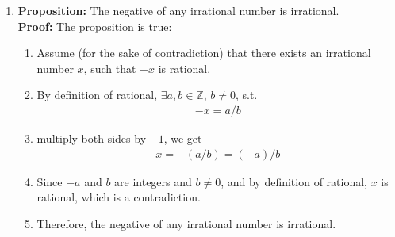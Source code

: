 \documentclass[11pt, preview]{standalone} %
\begin{document}
\begin{enumerate}
\begin{enumerate}[(1)]
    \begin{align*}
      6 \times y \geq 6 \times 6
      \text{ i.e. } 6 \times y \geq 36
    \end{align*}
  \item So $x \times y \geq 36$
  \item Therefore, if $x \times y < 36$ then $x < 6$ or $y < 6$.
  \end{enumerate}
  \begin{Choices}
    \begin{enumerate}
    \TrueChoice\item The proof is correct.
    \FalseChoice\item The proof is incorrect because (1) is not a negation of the
      original implication's conclusion.
    \FalseChoice\item The proof is incorrect because there is an error at (2).
    \FalseChoice\item The proof is incorrect because from (1) - (4) we cannot get (5).
    \end{enumerate}
    \Solution The proof is correct. It is a proof by contraposition, 
    i.e., to prove ``$x \times y < 36 \implies (x < 6 \lor y < 6)$'', 
    we first prove ``$(x \geq 6 \land y \geq 6) \implies x \times y \geq 36$''
  \end{Choices}
\item \textbf{Proposition: } The negative of any irrational number is irrational.\\
  \textbf{Proof: }The proposition is true:
  \begin{enumerate}[(1)]
  \item Assume (for the sake of contradiction) that there exists an
    irrational number $x$, such that $-x$ is rational.
  \item By definition of rational, $\exists a,b \in \mathbb{Z}$, $b\neq 0$, s.t.
    \begin{align*}
      -x = a/b
    \end{align*}
  \item multiply both sides by $-1$, we get
    \begin{align*}
      x = -(a/b) = (-a)/b
    \end{align*}
  \item Since $-a$ and $b$ are integers and $b \neq 0$, and by
    definition of rational, $x$ is rational, which is a contradiction.
  \item Therefore, the negative of any irrational number is irrational.
  \end{enumerate}

\end{enumerate}
\end{document}
